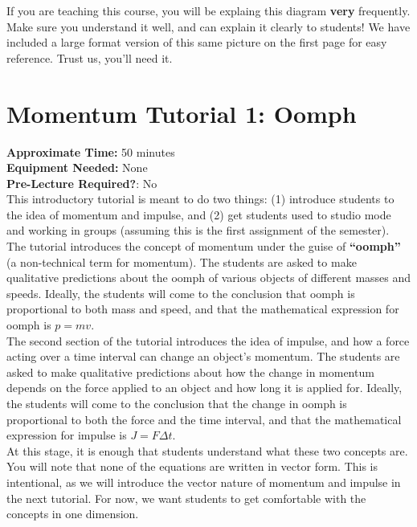 If you are teaching this course, you will be explaing this diagram \textbf{very} frequently.
Make sure you understand it well, and can explain it clearly to students! We have included a
large format version of this same picture on the first page for easy reference. Trust us, you'll need it. \\ 

\newpage
\section{Momentum Tutorial 1: Oomph}

\textbf{Approximate Time:} 50 minutes \\
\textbf{Equipment Needed:} None \\
\textbf{Pre-Lecture Required?}: No \\

This introductory tutorial is meant to do two things: (1) introduce students to the idea of momentum
and impulse, and (2) get students used to studio mode and working in groups (assuming this is
the first assignment of the semester). \\

The tutorial introduces the concept of momentum under the guise of \textbf{``oomph''} (a non-technical term
for momentum). The students are asked to make qualitative predictions about the oomph of various objects
of different masses and speeds.  Ideally, the students will come to the conclusion that oomph is proportional
to both mass and speed, and that the mathematical expression for oomph is $p = mv$.\\

The second section of the tutorial introduces the idea of impulse, and how a force acting over a time interval
can change an object's momentum.  The students are asked to make qualitative predictions about how the
change in momentum depends on the force applied to an object and how long it is applied for.  Ideally, the students will come to the conclusion
that the change in oomph is proportional to both the force and the time interval, and that the mathematical expression for impulse is
$J = F \Delta t$. \\

At this stage, it is enough that students understand what these two concepts are.  You will note
that none of the equations are written in vector form.  This is intentional, as we will introduce
the vector nature of momentum and impulse in the next tutorial.  For now, we want students
to get comfortable with the concepts in one dimension. \\

